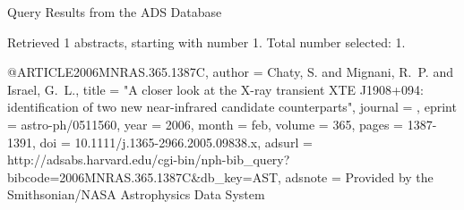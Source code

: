 Query Results from the ADS Database


Retrieved 1 abstracts, starting with number 1.  Total number selected: 1.

@ARTICLE{2006MNRAS.365.1387C,
   author = {{Chaty}, S. and {Mignani}, R.~P. and {Israel}, G.~L.},
    title = "{A closer look at the X-ray transient XTE J1908+094: identification of two new near-infrared candidate counterparts}",
  journal = {\mnras},
   eprint = {astro-ph/0511560},
     year = 2006,
    month = feb,
   volume = 365,
    pages = {1387-1391},
      doi = {10.1111/j.1365-2966.2005.09838.x},
   adsurl = {http://adsabs.harvard.edu/cgi-bin/nph-bib_query?bibcode=2006MNRAS.365.1387C&db_key=AST},
  adsnote = {Provided by the Smithsonian/NASA Astrophysics Data System}
}


